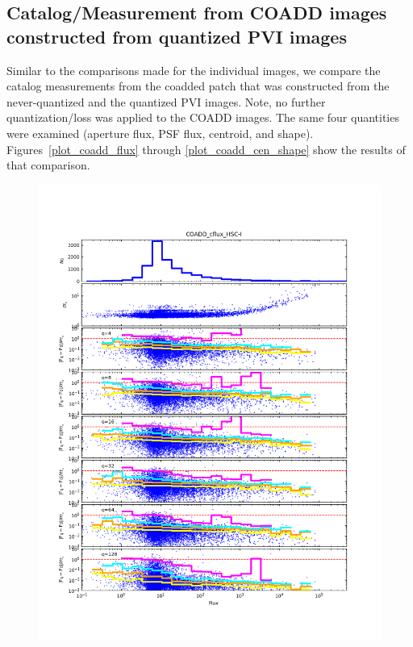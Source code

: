 \subsection{Catalog/Measurement from COADD images constructed from quantized PVI images}

Similar to the comparisons made for the individual images, we compare the catalog measurements from the coadded patch
that was constructed from the never-quantized and the quantized PVI images.  Note, no further quantization/loss was applied
to the COADD images.  The same four quantities were examined (aperture flux, PSF flux, centroid, and shape).  
Figures~\ref{plot_coadd_flux} through \ref{plot_coadd_cen_shape} show the results of that comparison.


\begin{figure}[t]
\centering
    \begin{minipage}{.49\textwidth}
        \centering
        \includegraphics[width=1.0\textwidth]{figure/plot_coadd_cflux_HSC-I.png}

\end{minipage}
\end{figure}
